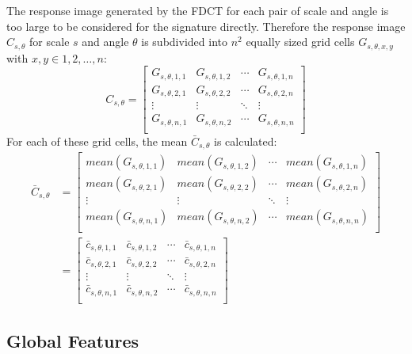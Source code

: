 The response image generated by the FDCT for each pair of scale and angle is
too large to be considered for the signature directly. Therefore the response
image $C_{s, \theta}$ for scale $s$ and angle $\theta$ is subdivided into $n^2$
equally sized grid cells $G_{s, \theta, x, y}$ with $x, y \in 1, 2, \dots, n$:
\begin{equation*}
    C_{s,\theta} =
    \begin{bmatrix}
        G_{s,\theta,1,1} & G_{s,\theta,1,2} & \cdots & G_{s,\theta,1,n} \\
        G_{s,\theta,2,1} & G_{s,\theta,2,2} & \cdots & G_{s,\theta,2,n} \\
        \vdots  & \vdots  & \ddots & \vdots  \\
        G_{s,\theta,n,1} & G_{s,\theta,n,2} & \cdots & G_{s,\theta,n,n} \\
    \end{bmatrix}
\end{equation*}
For each of these grid cells, the mean $\bar{C}_{s, \theta}$ is calculated:
\begin{align*}
    \bar{C}_{s,\theta} &=
    \begin{bmatrix}
        mean(G_{s,\theta,1,1}) & mean(G_{s,\theta,1,2}) & \cdots & mean(G_{s,\theta,1,n}) \\
        mean(G_{s,\theta,2,1}) & mean(G_{s,\theta,2,2}) & \cdots & mean(G_{s,\theta,2,n}) \\
        \vdots  & \vdots  & \ddots & \vdots  \\
        mean(G_{s,\theta,n,1}) & mean(G_{s,\theta,n,2}) & \cdots & mean(G_{s,\theta,n,n}) \\
    \end{bmatrix} \\
    &=
    \begin{bmatrix}
        \bar{c}_{s,\theta,1,1} & \bar{c}_{s,\theta,1,2} & \cdots & \bar{c}_{s,\theta,1,n} \\
        \bar{c}_{s,\theta,2,1} & \bar{c}_{s,\theta,2,2} & \cdots & \bar{c}_{s,\theta,2,n} \\
        \vdots  & \vdots  & \ddots & \vdots  \\
        \bar{c}_{s,\theta,n,1} & \bar{c}_{s,\theta,n,2} & \cdots & \bar{c}_{s,\theta,n,n} \\
    \end{bmatrix}
\end{align*}

\subsection{Global Features}

